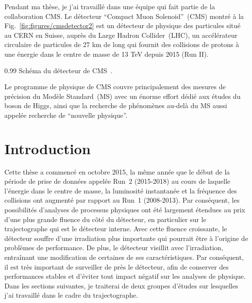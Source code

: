 \appendix
\renewcommand\chaptername{Appendix}                      %
\renewcommand\thechapter{\Alph{chapter}}                %
\renewcommand\thesection{\Alph{chapter}.\Roman{section}} %
\setcounter{chapter}{0}   

Pendant ma thèse, je j'ai travaillé dans une équipe qui fait partie de la collaboration CMS. Le détecteur ``Compact Muon Solenoid''~(CMS) montré  à la Fig.~\ref{fig:figures/cmsdetector2} est un détecteur de physique des particules situé au CERN en Suisse, auprès du Large Hadron Collider~(LHC), un accélérateur circulaire de particules de 27 km de long qui fournit des collisions de protons à une énergie dans le centre de masse de 13 TeV depuis 2015 (Run II).

                 {0.99}       %
                 { Schéma du détecteur de CMS~\cite{website:CMSdet}. }


Le programme de physique de CMS couvre principalement des mesures de précision du Modèle Standard~(MS) avec un énorme effort dédié aux études du boson de Higgs, ainsi que la recherche de phénomènes au-delà du MS aussi appelée recherche de ``nouvelle physique''.

\section{Introduction}


Cette thèse a commencé en octobre 2015, la même année que le début de la période de prise de données appelée Run~2 (2015-2018) au cours de laquelle l’énergie dans le centre de masse, la luminosité instantanée et la fréquence des collisions ont augmenté par rapport au Run~1 (2008-2013). Par conséquent, les possibilités d'analyses de processus physiques ont été largement étendues au prix d'une plus grande fluence du côté du détecteur, en particulier sur le trajectographe qui est le détecteur interne. Avec cette fluence croissante, le détecteur souffre d’une irradiation plus importante qui pourrait être à l’origine de problèmes de performance. De plus, le détecteur vieillit avec l'irradiation, entraînant une modification de certaines de ses caractéristiques. Par conséquent, il est très important de surveiller de près le détecteur, afin de conserver des performances stables et d'éviter tout impact négatif sur les analyses de physique. Dans les sections suivantes, je traiterai de deux groupes d’études sur lesquelles j’ai travaillé dans le cadre du trajectographe.

